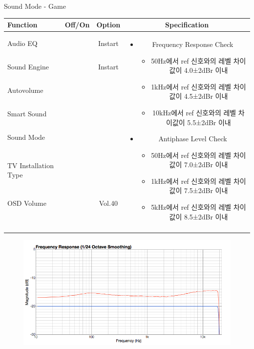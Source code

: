 \begin{frame}[t]{Sound Mode - Game}
\begin{tiny}
\begin{tabular}{@{}lccc@{}}
\toprule
Function & Off/On & Option & Specification \\
\midrule
Audio EQ & \color{black}{Off} & Instart &
\multirow{10}{60mm}{
\begin{itemize}
\item Frequency Response Check
  \begin{itemize}
  \item 50Hz에서 ref 신호와의 레벨 차이값이 4.0±2dBr 이내
  \item 1kHz에서 ref 신호와의 레벨 차이값이 4.5±2dBr 이내
  \item 10kHz에서 ref 신호와의 레벨 차이값이 5.5±2dBr 이내
  \end{itemize}
\item Antiphase Level Check
  \begin{itemize}
  \item 50Hz에서 ref 신호와의 레벨 차이값이 7.0±2dBr 이내
  \item 1kHz에서 ref 신호와의 레벨 차이값이 7.5±2dBr 이내
  \item 5kHz에서 ref 신호와의 레벨 차이값이 8.5±2dBr 이내
  \end{itemize}
\end{itemize}
} \\
Sound Engine & \color{blue}{On} & Instart & \\
Autovolume & \color{black}{Off} & & \\
Smart Sound & \color{black}{Off} & & \\
Sound Mode & \color{blue}{On} & \color{blue}{Game} & \\
TV Installation Type & \color{blue}{On} & \color{black}{Standtype1} & \\
OSD Volume & \color{blue}{On} & Vol.40 & \\
& & & \\
& & & \\
& & & \\
& & & \\
\midrule
\end{tabular}
\end{tiny}

\begin{figure}[b]
\includegraphics[height=0.3\textwidth]{figures/game.png}
\end{figure}

\end{frame}

